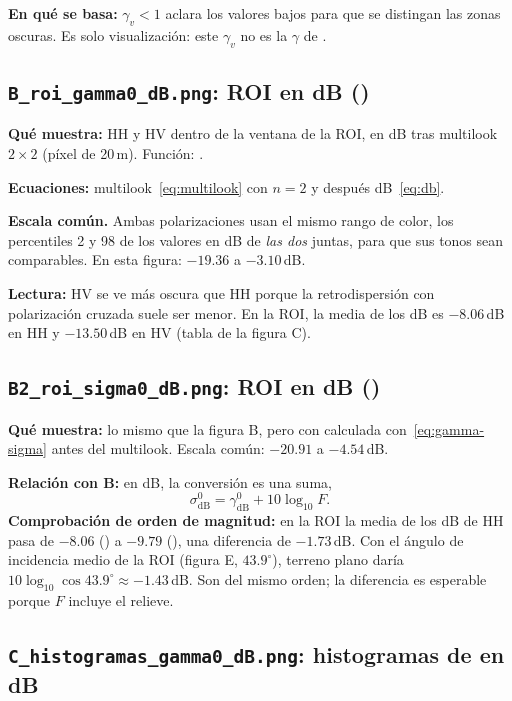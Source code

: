 \documentclass[11pt,a4paper]{article}
\begin{document}
\textbf{En qué se basa:} $\gamma_v < 1$ aclara los valores bajos para que se distingan las zonas oscuras. Es solo visualización: este
$\gamma_v$ no es la $\gamma$ de \gz.

\subsection{\texttt{B\_roi\_gamma0\_dB.png}: ROI en dB (\gz)}

\textbf{Qué muestra:} \gz{} HH y HV dentro de la ventana de la ROI, en dB tras multilook $2\times2$ (píxel de 20\,m). Función:
.

\textbf{Ecuaciones:} multilook~\eqref{eq:multilook} con $n = 2$ y después dB~\eqref{eq:db}.

\textbf{Escala común.} Ambas polarizaciones usan el mismo rango de color, los percentiles 2 y 98 de los valores en dB de \emph{las dos}
juntas, para que sus tonos sean comparables. En esta figura: $-19.36$ a $-3.10$\,dB.

\textbf{Lectura:} HV se ve más oscura que HH porque la retrodispersión con polarización cruzada suele ser menor. En la ROI, la media de
los dB es $-8.06$\,dB en HH y $-13.50$\,dB en HV (tabla de la figura C).

\subsection{\texttt{B2\_roi\_sigma0\_dB.png}: ROI en dB (\sz)}

\textbf{Qué muestra:} lo mismo que la figura B, pero con \sz{} calculada con~\eqref{eq:gamma-sigma} antes del multilook. Escala común:
$-20.91$ a $-4.54$\,dB.

\textbf{Relación con B:} en dB, la conversión es una suma,
\begin{equation}
  \sigma^0_{\text{dB}} = \gamma^0_{\text{dB}} + 10\log_{10} F .
\end{equation}
\textbf{Comprobación de orden de magnitud:} en la ROI la media de los dB de HH pasa de $-8.06$ (\gz) a $-9.79$ (\sz), una diferencia de
$-1.73$\,dB. Con el ángulo de incidencia medio de la ROI (figura E, $43.9^\circ$), terreno plano daría
$10\log_{10}\cos 43.9^\circ \approx -1.43$\,dB. Son del mismo orden; la diferencia es esperable porque $F$ incluye el relieve.

\subsection{\texttt{C\_histogramas\_gamma0\_dB.png}: histogramas de \gz{} en dB}
\end{document}
